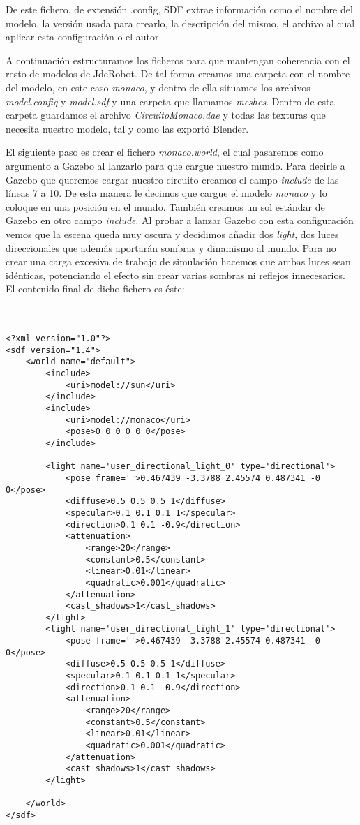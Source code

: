 De este fichero, de extensión .config, SDF extrae información como el nombre del modelo, la versión usada para crearlo, la descripción del mismo, el archivo al cual aplicar esta configuración o el autor.

A continuación estructuramos los ficheros para que mantengan coherencia con el resto de modelos de JdeRobot. De tal forma creamos una carpeta con el nombre del modelo, en este caso \textit{monaco}, y dentro de ella situamos los archivos \textit{model.config} y \textit{model.sdf} y una carpeta que llamamos \textit{meshes}. Dentro de esta carpeta guardamos el archivo \textit{CircuitoMonaco.dae} y todas las texturas que necesita nuestro modelo, tal y como las exportó Blender.

El siguiente paso es crear el fichero \textit{monaco.world}, el cual pasaremos como argumento a Gazebo al lanzarlo para que cargue nuestro mundo. Para decirle a Gazebo que queremos cargar nuestro circuito creamos el campo \textit{include} de las líneas 7 a 10. De esta manera le decimos que cargue el modelo \textit{monaco} y lo coloque en una posición en el mundo. También creamos un sol estándar de Gazebo en otro campo \textit{include}. Al probar a lanzar Gazebo con esta configuración vemos que la escena queda muy oscura y decidimos añadir dos \textit{light}, dos luces direccionales que además aportarán sombras y dinamismo al mundo. Para no crear una carga excesiva de trabajo de simulación hacemos que ambas luces sean idénticas, potenciando el efecto sin crear varias sombras ni reflejos innecesarios. El contenido final de dicho fichero es éste:
\\
\\
\\
\lstset{language=xml}
\begin{lstlisting}
<?xml version="1.0"?>
<sdf version="1.4">
	<world name="default">
		<include>
			<uri>model://sun</uri>
		</include>
		<include>
			<uri>model://monaco</uri>
			<pose>0 0 0 0 0 0</pose>
		</include>

		<light name='user_directional_light_0' type='directional'>
			<pose frame=''>0.467439 -3.3788 2.45574 0.487341 -0 0</pose>
			<diffuse>0.5 0.5 0.5 1</diffuse>
			<specular>0.1 0.1 0.1 1</specular>
			<direction>0.1 0.1 -0.9</direction>
			<attenuation>
				<range>20</range>
				<constant>0.5</constant>
				<linear>0.01</linear>
				<quadratic>0.001</quadratic>
			</attenuation>
			<cast_shadows>1</cast_shadows>
		</light>
		<light name='user_directional_light_1' type='directional'>
			<pose frame=''>0.467439 -3.3788 2.45574 0.487341 -0 0</pose>
			<diffuse>0.5 0.5 0.5 1</diffuse>
			<specular>0.1 0.1 0.1 1</specular>
			<direction>0.1 0.1 -0.9</direction>
			<attenuation>
				<range>20</range>
				<constant>0.5</constant>
				<linear>0.01</linear>
				<quadratic>0.001</quadratic>
			</attenuation>
			<cast_shadows>1</cast_shadows>
		</light>

	</world>
</sdf>
\end{lstlisting}

